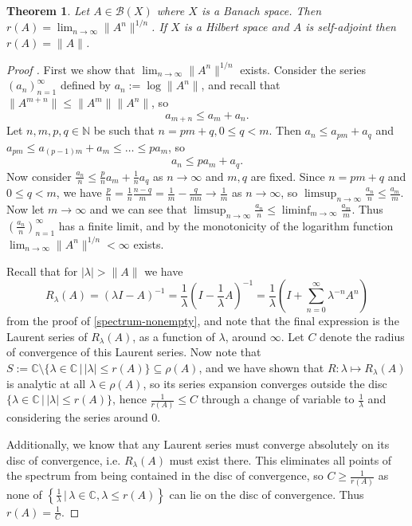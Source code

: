 \documentclass[12pt,oneside]{report}
\newtheorem{thm}{Theorem}[chapter]
\begin{document}
\begin{thm}\label{spectral-radius}
    Let $A \in \mathscr{B}(X)$ where $X$ is a Banach space. Then $r(A) = \lim_{ n \to \infty } \|A^{n}\|^{1/n}$. If $X$ is a Hilbert space and $A$ is self-adjoint then $r(A) = \|A\|$.
\end{thm}
\begin{proof}[Proof \cite{Reed_Simon_1980} \cite{Hunter_Nachtergaele_2007}]
    First we show that $\lim_{ n \to \infty } \|A^{n}\|^{1/n}$ exists. Consider the series $(a_{n})_{n=1}^{\infty}$ defined by $a_{n} := \log\|A^{n}\|$, and recall that $\|A^{m+n}\| \leq \|A^{m}\|\|A^{n}\|$, so $$a_{m+n} \leq a_{m} + a_{n}.$$ Let $n,m,p,q \in \mathbb{N}$ be such that $n = pm + q, 0 \leq q < m$. Then $a_{n} \leq a_{pm} + a_{q}$ and $a_{pm} \leq a_{(p-1)m} + a_{m} \leq \dots \leq pa_{m}$, so $$a_{n} \leq pa_{m} + a_{q}.$$ Now consider $\frac{a_{n}}{n} \leq \frac{p}{n}a_{m} + \frac{1}{n}a_{q}$ as $n \to \infty$ and $m, q$ are fixed. Since $n = pm + q$ and $0 \leq q < m$, we have $\frac{p}{n} = \frac{1}{n}\frac{n - q}{m} = \frac{1}{m} - \frac{q}{mn} \to \frac{1}{m}$ as $n \to \infty$, so $\limsup_{n \to \infty} \frac{a_{n}}{n} \leq \frac{a_{m}}{m}$. Now let $m \to \infty$ and we can see that $\limsup_{n \to \infty}\frac{a_{n}}{n} \leq \liminf_{m \to \infty}\frac{a_{m}}{m}$. Thus $\left( \frac{a_{n}}{n} \right)_{n=1}^{\infty}$ has a finite limit, and by the monotonicity of the logarithm function $\lim_{ n \to \infty }\|A^{n}\|^{1/n} < \infty$ exists.
    
    Recall that for $|\lambda| > \|A\|$ we have $$R_{\lambda}(A) = (\lambda I - A)^{-1} = \frac{1}{\lambda}\left( I - \frac{1}{\lambda}A \right)^{-1} = \frac{1}{\lambda}\left( I + \sum_{n=0}^{\infty} \lambda^{-n} A^{n} \right)$$ from the proof of \ref{spectrum-nonempty}, and note that the final expression is the Laurent series of $R_{\lambda}(A)$, as a function of $\lambda$, around $\infty$. Let $C$ denote the radius of convergence of this Laurent series. Now note that $S := \mathbb{C} \setminus \{ \lambda \in \mathbb{C} \, | \, |\lambda| \leq r(A) \} \subseteq \rho(A)$, and we have shown that $R: \lambda \mapsto R_\lambda(A)$ is analytic at all $\lambda \in \rho(A)$, so its series expansion converges outside the disc $\{ \lambda \in \mathbb{C} \, | \, |\lambda| \leq r(A) \}$, hence $\frac{1}{r(A)} \leq C$ through a change of variable to $\frac{1}{\lambda}$ and considering the series around $0$.

    Additionally, we know that any Laurent series must converge absolutely on its disc of convergence, i.e. $R_{\lambda}(A)$ must exist there. This eliminates all points of the spectrum from being contained in the disc of convergence, so $C \geq \frac{1}{r(A)}$ as none of $\left\{  \frac{1}{\lambda} \, | \, \lambda \in \mathbb{C}, \lambda \leq r(A) \right\}$ can lie on the disc of convergence. Thus $r(A) = \frac{1}{C}$.
    

\end{proof}
\end{document}
